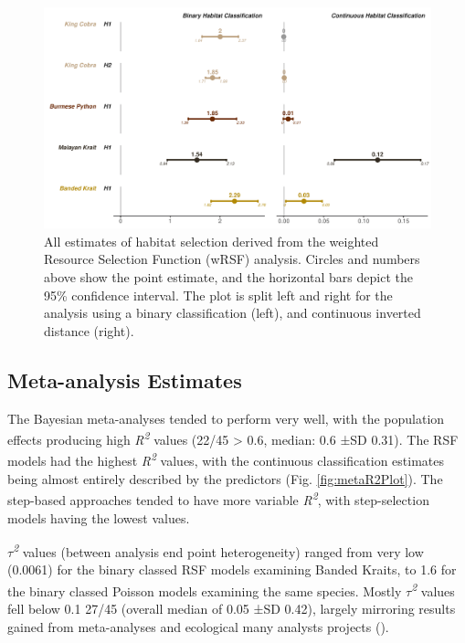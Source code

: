 \documentclass[10pt,a4paper]{article}
\begin{document}
\begin{figure}
\includegraphics[width=1\linewidth]{../../figures/specCurve_wrsf} \caption{All estimates of habitat selection derived from the weighted Resource Selection Function (wRSF) analysis. Circles and numbers above show the point estimate, and the horizontal bars depict the 95\% confidence interval. The plot is split left and right for the analysis using a binary classification (left), and continuous inverted distance (right).}\label{fig:specCurveWrsf}
\end{figure}

\subsection{Meta-analysis Estimates}\label{meta-analysis-estimates}

The Bayesian meta-analyses tended to perform very well, with the population effects producing high \emph{R\textsuperscript{2}} values (22/45 \textgreater{} 0.6, median: 0.6 ±SD 0.31).
The RSF models had the highest \emph{R\textsuperscript{2}} values, with the continuous classification estimates being almost entirely described by the predictors (Fig. \ref{fig:metaR2Plot}).
The step-based approaches tended to have more variable \emph{R\textsuperscript{2}}, with step-selection models having the lowest values.

\emph{\(\tau\)\textsuperscript{2}} values (between analysis end point heterogeneity) ranged from very low (0.0061) for the binary classed RSF models examining Banded Kraits, to 1.6 for the binary classed Poisson models examining the same species.
Mostly \emph{\(\tau\)\textsuperscript{2}} values fell below 0.1 27/45 (overall median of 0.05 ±SD 0.42), largely mirroring results gained from meta-analyses and ecological many analysts projects ().
\end{document}
